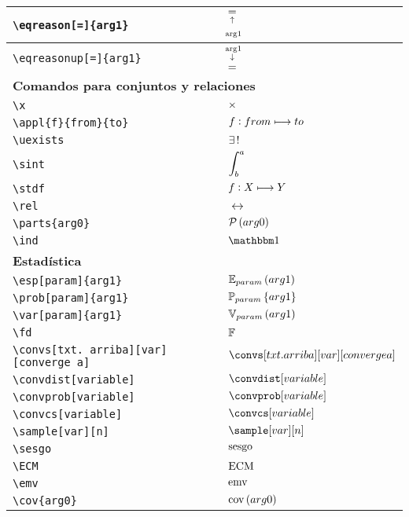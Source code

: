 \begin{longtable}{|p{3.5cm}|p{2cm}|}
\verb|\eqreason[=]{arg1}| & $\displaystyle\eqreason[=]{arg1}$ \\ \midrule 
\verb|\eqreasonup[=]{arg1}| & $\displaystyle\eqreasonup[=]{arg1}$ \\ \midrule 
\bottomrule \multicolumn{2}{|p{5.5cm}|}{\textbf{Comandos para conjuntos y relaciones}} \\ \toprule 
\verb|\x| & $\displaystyle\times$ \\ \midrule 
\verb|\appl{f}{from}{to}| & $\displaystyle f : from\longmapsto to$ \\ \midrule 
\verb|\uexists| & $\displaystyle\exists\, !\;$ \\ \midrule 
\verb|\sint| & $\displaystyle\int_b^a\;$ \\ \midrule 
\verb|\stdf| & $\displaystyle f : X\longmapsto Y$ \\ \midrule 
\verb|\rel| & $\displaystyle\rel$ \\ \midrule 
\verb|\parts{arg0}| & $\displaystyle\mathcal{P}\left(arg0\right)$ \\ \midrule 
\verb|\ind| & $\displaystyle\ind$ \\ \midrule 
\bottomrule \multicolumn{2}{|p{5.5cm}|}{\textbf{Estadística}} \\ \toprule 
\verb|\esp[param]{arg1}| & $\displaystyle\esp[param]{arg1}$ \\ \midrule 
\verb|\prob[param]{arg1}| & $\displaystyle\prob[param]{arg1}$ \\ \midrule 
\verb|\var[param]{arg1}| & $\displaystyle\var[param]{arg1}$ \\ \midrule 
\verb|\fd| & $\displaystyle\mathbb{F}$ \\ \midrule 
\verb|\convs[txt. arriba][var][converge a]| & $\displaystyle\convs[txt. arriba][var][converge a]$ \\ \midrule 
\verb|\convdist[variable]| & $\displaystyle\convdist[variable]$ \\ \midrule 
\verb|\convprob[variable]| & $\displaystyle\convprob[variable]$ \\ \midrule 
\verb|\convcs[variable]| & $\displaystyle\convcs[variable]$ \\ \midrule 
\verb|\sample[var][n]| & $\displaystyle\sample[var][n]$ \\ \midrule 
\verb|\sesgo| & $\displaystyle\operatorname{sesgo}$ \\ \midrule 
\verb|\ECM| & $\displaystyle\operatorname{ECM}$ \\ \midrule 
\verb|\emv| & $\displaystyle\operatorname{emv}$ \\ \midrule 
\verb|\cov{arg0}| & $\displaystyle\mathrm{cov}\left(arg0\right)$ \\ \midrule 

\end{longtable}
